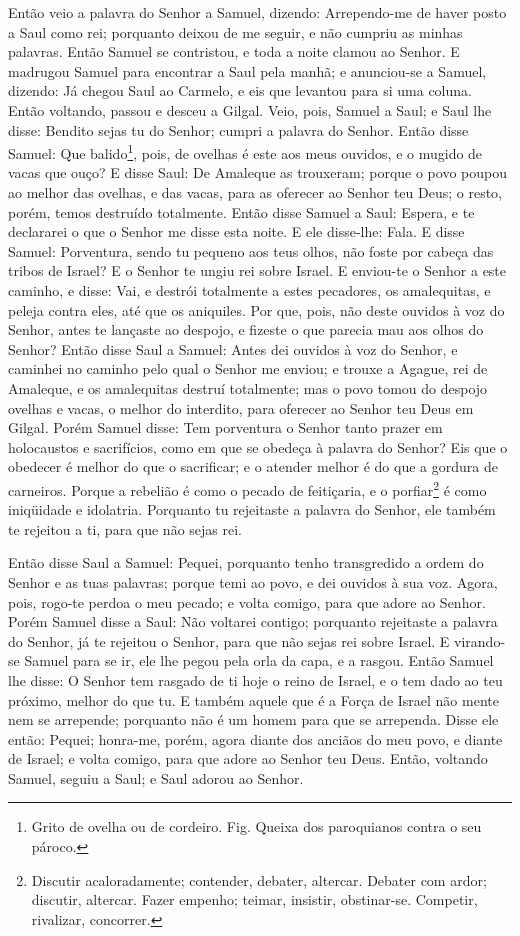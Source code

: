 Então veio a palavra do Senhor a Samuel, dizendo:
Arrependo-me de haver posto a Saul como rei; porquanto deixou
de me seguir, e não cumpriu as minhas palavras. Então Samuel se
contristou, e toda a noite clamou ao Senhor. E madrugou
Samuel para encontrar a Saul pela manhã; e anunciou-se a Samuel,
dizendo: Já chegou Saul ao Carmelo, e eis que levantou para si uma
coluna. Então voltando, passou e desceu a Gilgal. Veio, pois,
Samuel a Saul; e Saul lhe disse: Bendito sejas tu do Senhor; cumpri
a palavra do Senhor. Então disse Samuel: Que
balido\footnote{Grito de ovelha ou de cordeiro. Fig. Queixa dos
paroquianos contra o seu pároco.}, pois, de ovelhas é este aos meus
ouvidos, e o mugido de vacas que ouço? E disse Saul: De
Amaleque as trouxeram; porque o povo poupou ao melhor das ovelhas, e
das vacas, para as oferecer ao Senhor teu Deus; o resto, porém,
temos destruído totalmente. Então disse Samuel a Saul:
Espera, e te declararei o que o Senhor me disse esta noite. E ele
disse-lhe: Fala. E disse Samuel: Porventura, sendo tu pequeno
aos teus olhos, não foste por cabeça das tribos de Israel? E o
Senhor te ungiu rei sobre Israel. E enviou-te o Senhor a este
caminho, e disse: Vai, e destrói totalmente a estes pecadores, os
amalequitas, e peleja contra eles, até que os aniquiles. Por
que, pois, não deste ouvidos à voz do Senhor, antes te lançaste ao
despojo, e fizeste o que parecia mau aos olhos do Senhor?
Então disse Saul a Samuel: Antes dei ouvidos à voz do Senhor,
e caminhei no caminho pelo qual o Senhor me enviou; e trouxe a
Agague, rei de Amaleque, e os amalequitas destruí totalmente;
mas o povo tomou do despojo ovelhas e vacas, o melhor do
interdito, para oferecer ao Senhor teu Deus em Gilgal. Porém
Samuel disse: Tem porventura o Senhor tanto prazer em holocaustos e
sacrifícios, como em que se obedeça à palavra do Senhor? Eis que o
obedecer é melhor do que o sacrificar; e o atender melhor é do que a
gordura de carneiros. Porque a rebelião é como o pecado de
feitiçaria, e o porfiar\footnote{Discutir acaloradamente; contender,
debater, altercar. Debater com ardor; discutir, altercar. Fazer
empenho; teimar, insistir, obstinar-se. Competir, rivalizar,
concorrer.} é como iniqüidade e idolatria. Porquanto tu rejeitaste a
palavra do Senhor, ele também te rejeitou a ti, para que não sejas
rei.

Então disse Saul a Samuel: Pequei, porquanto tenho transgredido a
ordem do Senhor e as tuas palavras; porque temi ao povo, e dei
ouvidos à sua voz. Agora, pois, rogo-te perdoa o meu pecado;
e volta comigo, para que adore ao Senhor. Porém Samuel disse
a Saul: Não voltarei contigo; porquanto rejeitaste a palavra do
Senhor, já te rejeitou o Senhor, para que não sejas rei sobre
Israel. E virando-se Samuel para se ir, ele lhe pegou pela
orla da capa, e a rasgou. Então Samuel lhe disse: O Senhor
tem rasgado de ti hoje o reino de Israel, e o tem dado ao teu
próximo, melhor do que tu. E também aquele que é a Força de
Israel não mente nem se arrepende; porquanto não é um homem para que
se arrependa. Disse ele então: Pequei; honra-me, porém, agora
diante dos anciãos do meu povo, e diante de Israel; e volta comigo,
para que adore ao Senhor teu Deus. Então, voltando Samuel,
seguiu a Saul; e Saul adorou ao Senhor.

